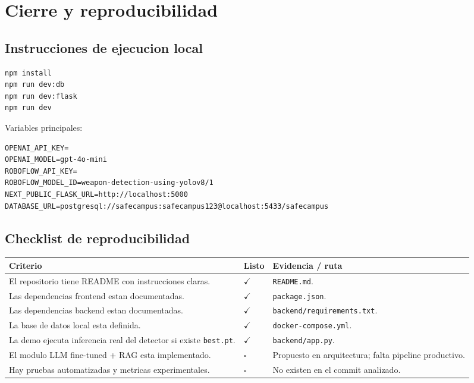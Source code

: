 \documentclass[11pt,letterpaper]{article}
\newcommand{\ok}{$\checkmark$}
\newcommand{\pending}{$\square$}
\begin{document}
\section{Cierre y reproducibilidad}

\subsection{Instrucciones de ejecucion local}

\begin{verbatim}
npm install
npm run dev:db
npm run dev:flask
npm run dev
\end{verbatim}

Variables principales:

\begin{verbatim}
OPENAI_API_KEY=
OPENAI_MODEL=gpt-4o-mini
ROBOFLOW_API_KEY=
ROBOFLOW_MODEL_ID=weapon-detection-using-yolov8/1
NEXT_PUBLIC_FLASK_URL=http://localhost:5000
DATABASE_URL=postgresql://safecampus:safecampus123@localhost:5433/safecampus
\end{verbatim}

\subsection{Checklist de reproducibilidad}

\begin{tabularx}{\textwidth}{P{7.4cm}P{1.6cm}Y}
    \toprule
    \textbf{Criterio} & \textbf{Listo} & \textbf{Evidencia / ruta} \\
    \midrule
    El repositorio tiene README con instrucciones claras. & \ok & \texttt{README.md}. \\
    Las dependencias frontend estan documentadas. & \ok & \texttt{package.json}. \\
    Las dependencias backend estan documentadas. & \ok & \texttt{backend/requirements.txt}. \\
    La base de datos local esta definida. & \ok & \texttt{docker-compose.yml}. \\
    La demo ejecuta inferencia real del detector si existe \texttt{best.pt}. & \ok & \texttt{backend/app.py}. \\
    El modulo LLM fine-tuned + RAG esta implementado. & \pending & Propuesto en arquitectura; falta pipeline productivo. \\
    Hay pruebas automatizadas y metricas experimentales. & \pending & No existen en el commit analizado. \\
    \bottomrule
\end{tabularx}
\end{document}
